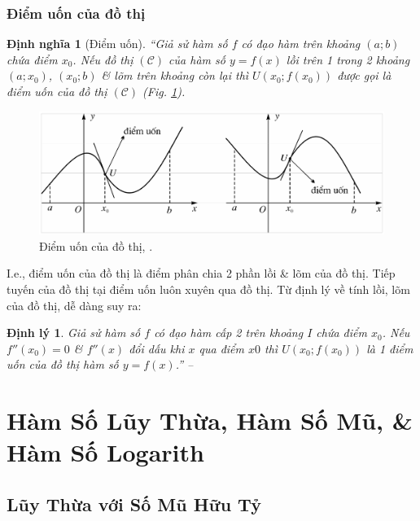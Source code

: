 \documentclass[oneside]{book}
\numberwithin{equation}{section}
\newtheorem{dinhnghia}{Định nghĩa}[section]
\newtheorem{dinhly}{Định lý}[section]
\begin{document}
\subsection{Điểm uốn của đồ thị}

\begin{dinhnghia}[Điểm uốn]
	``Giả sử hàm số $f$ có đạo hàm trên khoảng $(a;b)$ chứa điểm $x_0$. Nếu đồ thị $(\mathcal{C})$ của hàm số $y = f(x)$ lồi trên 1 trong 2 khoảng $(a;x_0)$, $(x_0;b)$ \& lõm trên khoảng còn lại thì $U(x_0;f(x_0))$ được gọi là \emph{điểm uốn} của đồ thị $(\mathcal{C})$ (Fig. \ref{fig:diem_uon}).
\end{dinhnghia}

\begin{figure}[H]
	\centering
	\includegraphics[scale=0.2]{diem_uon}
	\caption{Điểm uốn của đồ thị, \cite[Hình 1.23, p. 60]{SGK_Toan_12_giai_tich_nang_cao}.}
	\label{fig:diem_uon}
\end{figure}
I.e., điểm uốn của đồ thị là điểm phân chia 2 phần lồi \& lõm của đồ thị. Tiếp tuyến của đồ thị tại điểm uốn luôn xuyên qua đồ thị. Từ định lý về tính lồi, lõm của đồ thị, dễ dàng suy ra:

\begin{dinhly}
	Giả sử hàm số $f$ có đạo hàm cấp 2 trên khoảng $I$ chứa điểm $x_0$. Nếu $f''(x_0) = 0$ \& $f''(x)$ đổi dấu khi $x$ qua điểm $x0$ thì $U(x_0;f(x_0))$ là 1 điểm uốn của đồ thị hàm số $y = f(x)$.'' -- \cite[p. 60]{SGK_Toan_12_giai_tich_nang_cao}
\end{dinhly}


\chapter{Hàm Số Lũy Thừa, Hàm Số Mũ, \& Hàm Số Logarith}

\section{Lũy Thừa với Số Mũ Hữu Tỷ}
\end{document}
